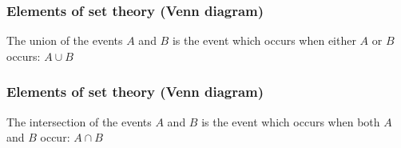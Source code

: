 \documentclass[notes=show,handout]{beamer}
\begin{document}
\begin{frame}
\frametitle{Elements of set theory (Venn diagram)}

The union of the events $A$ and $B$ is the event which occurs when either $A$ or $B$ occurs: $A \cup B$ \\
\vspace{1cm}
\hspace{2cm}
\def\firstcircle{(0,0) circle (1.5cm)}
\def\secondcircle{(45:2cm) circle (1.5cm)}

\end{frame}


\begin{frame}
\frametitle{Elements of set theory (Venn diagram)}

The intersection of the events $A$ and $B$ is the event which occurs when both $A$ and $B$ occur: $A \cap B$\\
\vspace{1cm}
\hspace{2cm}
\def\firstcircle{(0,0) circle (1.5cm)}
\def\secondcircle{(45:2cm) circle (1.5cm)}

\end{frame}


%
%
\end{document}

